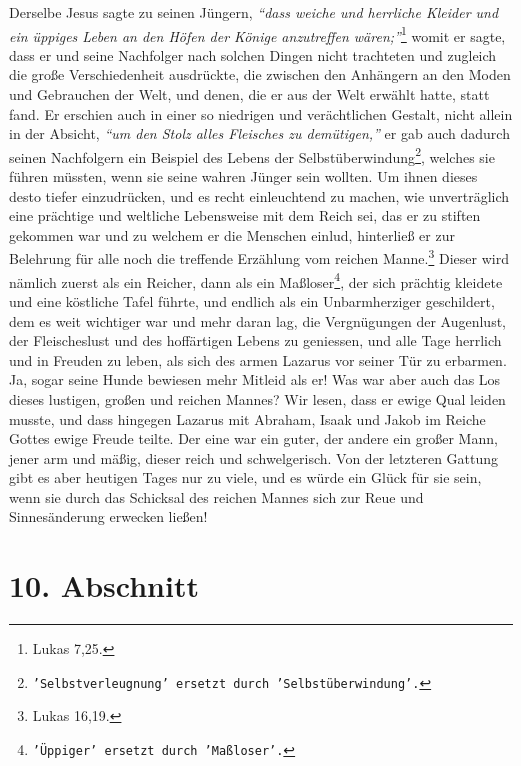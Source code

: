 Derselbe Jesus sagte
zu seinen Jüngern,
\textit{"`dass weiche und herrliche Kleider und ein üppiges Leben an
den Höfen der Könige anzutreffen wären;"'}\footnote{Lukas 7,25.}
womit er sagte,
dass er und seine Nachfolger nach solchen Dingen nicht trachteten und zugleich
die große Verschiedenheit ausdrückte, die zwischen den Anhängern an den Moden
und Gebrauchen der Welt, und denen, die er aus der Welt erwählt hatte, statt
fand. Er erschien auch in einer so niedrigen und verächtlichen Gestalt, nicht
allein in der Absicht,
\textit{"`um den Stolz alles Fleisches zu demütigen,"'} er gab
auch dadurch seinen Nachfolgern ein Beispiel des Lebens der
Selbstüberwindung\footnote{\texttt{'Selbstverleugnung' ersetzt durch
'Selbstüberwindung'.}},
welches sie führen müssten, wenn sie seine wahren Jünger sein wollten. Um ihnen
dieses desto tiefer einzudrücken, und es recht einleuchtend zu machen, wie
unverträglich eine prächtige und weltliche Lebensweise mit dem Reich sei, das
er zu stiften gekommen war und zu welchem er die Menschen einlud, hinterließ
er zur Belehrung für alle noch die treffende Erzählung vom reichen
Manne.\footnote{Lukas 16,19.}
Dieser wird nämlich zuerst als ein Reicher, dann als
ein Maßloser\footnote{\texttt{'Üppiger' ersetzt durch 'Maßloser'.}}, der sich
prächtig
kleidete und eine köstliche Tafel führte, und
endlich als ein Unbarmherziger geschildert, dem es weit wichtiger war und mehr
daran lag, die Vergnügungen der Augenlust, der Fleischeslust und des hoffärtigen
Lebens zu geniessen, und alle Tage herrlich und in Freuden zu leben, als sich
des
armen Lazarus vor seiner Tür zu erbarmen. Ja, sogar
seine Hunde
bewiesen mehr
Mitleid als er! Was war aber auch das Los dieses lustigen, großen
und reichen
Mannes? Wir lesen, dass er ewige Qual leiden musste, und dass
hingegen Lazarus mit
Abraham, Isaak und
Jakob
im Reiche Gottes ewige Freude teilte. Der eine war ein
guter, der andere ein großer Mann, jener arm und mäßig, dieser reich und
schwelgerisch. Von der letzteren Gattung gibt es aber heutigen Tages nur zu
viele, und es würde ein Glück für sie sein, wenn sie durch das Schicksal des
reichen Mannes sich zur Reue und Sinnesänderung erwecken ließen!

\section{10. Abschnitt} \label{kap14_ab10}

